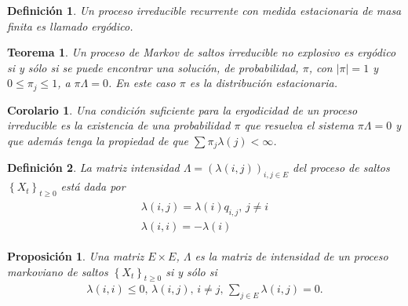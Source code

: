 \documentclass{article}
\newtheorem{Def}{Definición}[section]
\newtheorem{Teo}{Teorema}[section]
\newtheorem{Prop}{Proposición}[section]
\newtheorem{Cor}{Corolario}[section]
\numberwithin{equation}{section}
\begin{document}
\begin{Def}
Un proceso irreducible recurrente con medida estacionaria de masa finita es llamado erg\'odico.
\end{Def}

\begin{Teo}\label{Teo.4.3}
Un proceso de Markov de saltos irreducible no explosivo es erg\'odico si y s\'olo si se puede encontrar una soluci\'on, de probabilidad, $\pi$, con $|\pi|=1$ y $0\leq\pi_{j}\leq1$, a $\pi\Lambda=0$. En este caso $\pi$ es la distribuci\'on estacionaria.
\end{Teo}

\begin{Cor}\label{Cor.4.4}
Una condici\'on suficiente para la ergodicidad de un proceso irreducible es la existencia de una probabilidad $\pi$ que resuelva el sistema $\pi\Lambda=0$ y que adem\'as tenga la propiedad de que $\sum\pi_{j}\lambda\left(j\right)<\infty$.
\end{Cor}

%
%

\begin{Def}
La matriz intensidad $\Lambda=\left(\lambda\left(i,j\right)\right)_{i,j\in E}$ del proceso de saltos $\left\{X_{t}\right\}_{t\geq0}$ est\'a dada por
\begin{eqnarray}
\begin{array}{l}
\lambda\left(i,j\right)=\lambda\left(i\right)q_{i,j}\textrm{,    }j\neq i\\
\lambda\left(i,i\right)=-\lambda\left(i\right)
\end{array}
\end{eqnarray}
\end{Def}


\begin{Prop}\label{Prop.3.1}
Una matriz $E\times E$, $\Lambda$ es la matriz de intensidad de un proceso markoviano de saltos $\left\{X_{t}\right\}_{t\geq0}$ si y s\'olo si
\begin{eqnarray}
\lambda\left(i,i\right)\leq0\textrm{, }\lambda\left(i,j\right)\textrm{,   }i\neq j\textrm{,  }\sum_{j\in E}\lambda\left(i,j\right)=0.
\end{eqnarray}
\end{Prop}
\end{document}

